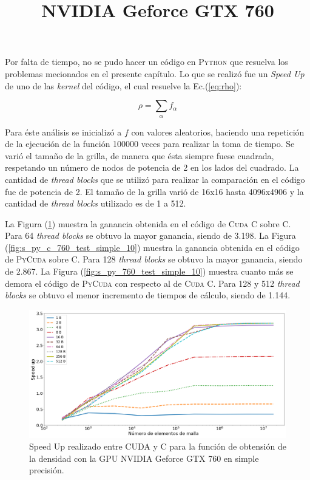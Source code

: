 Por falta de tiempo, no se pudo hacer un código en \textsc{Python} que resuelva los problemas mecionados en el presente capítulo. Lo que se realizó fue un \textit{Speed Up} 
de uno de las \textit{kernel} del código, el cual resuelve la Ec.(\ref{eq:rho}):

\begin{equation*}
	\rho = \sum_{\alpha} f_{\alpha}
\end{equation*}

Para éste análisis se inicializó a $f$ con valores aleatorios, haciendo una repetición de la ejecución de la función 100000 veces para realizar la toma de tiempo. Se varió el tamaño de la grilla, de manera que ésta siempre fuese cuadrada, respetando un número de nodos de potencia de 2 en los lados del cuadrado. La cantidad de \textit{thread blocks} que se utilizó para realizar la comparación en el código fue de potencia de 2. El tamaño de la grilla varió de 16x16 hasta 4096x4906 y la cantidad de \textit{thread blocks} utilizado es de 1 a 512.


\title{\textbf{NVIDIA Geforce GTX 760}}

La Figura (\ref{fig:s_cuda_760_test_simple_10}) muestra la ganancia obtenida en el código de \textsc{Cuda C} sobre \textsc{C}. Para 64 \textit{thread blocks} se obtuvo la mayor ganancia, siendo de 3.198. La Figura (\ref{fig:s_py_c_760_test_simple_10}) muestra la ganancia obtenida en el código de \textsc{PyCuda} sobre \textsc{C}. Para 128 \textit{thread blocks} se obtuvo la mayor ganancia, siendo de 2.867. La Figura (\ref{fig:s_py_760_test_simple_10}) muestra cuanto más se demora el código de \textsc{PyCuda} con respecto al de \textsc{Cuda C}. Para 128 y 512  \textit{thread blocks} se obtuvo el menor incremento de tiempos de cálculo, siendo de 1.144. 

\begin{figure}[h!]
	\centering
	\includegraphics[width=\textwidth]{figs/cap4/s_cuda_760_test_simple_10}
	\caption{Speed Up realizado entre CUDA y C para la función de obtensión de la densidad con la GPU NVIDIA Geforce GTX 760 en simple precisión.} 
	\label{fig:s_cuda_760_test_simple_10}	
\end{figure}


